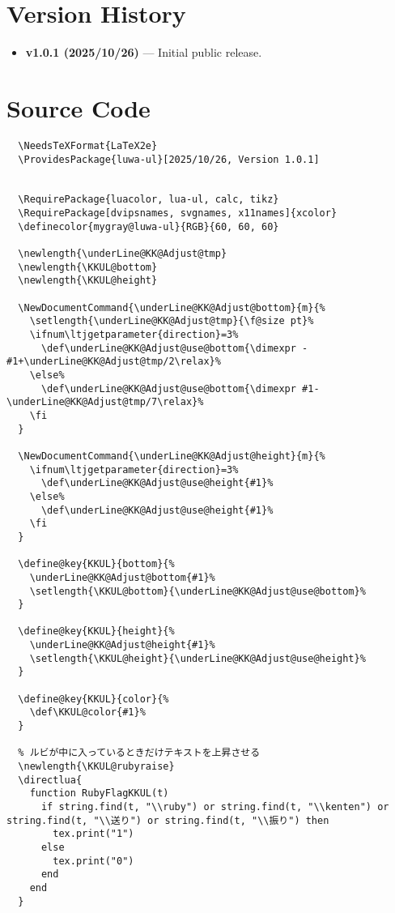 \documentclass[luatex,fontsize=8pt,paper=b5,twoside]{jlreq}%
\begin{document}
\section{Version History}
\begin{itemize}
  \item \textbf{v1.0.1 (2025/10/26)} --- Initial public release.
\end{itemize}

\section{Source Code}
\begin{lstlisting}
  \NeedsTeXFormat{LaTeX2e}
  \ProvidesPackage{luwa-ul}[2025/10/26, Version 1.0.1]


  \RequirePackage{luacolor, lua-ul, calc, tikz}
  \RequirePackage[dvipsnames, svgnames, x11names]{xcolor}
  \definecolor{mygray@luwa-ul}{RGB}{60, 60, 60}

  \newlength{\underLine@KK@Adjust@tmp}
  \newlength{\KKUL@bottom}
  \newlength{\KKUL@height}

  \NewDocumentCommand{\underLine@KK@Adjust@bottom}{m}{%
    \setlength{\underLine@KK@Adjust@tmp}{\f@size pt}%
    \ifnum\ltjgetparameter{direction}=3%
      \def\underLine@KK@Adjust@use@bottom{\dimexpr -#1+\underLine@KK@Adjust@tmp/2\relax}%
    \else%
      \def\underLine@KK@Adjust@use@bottom{\dimexpr #1-\underLine@KK@Adjust@tmp/7\relax}%
    \fi
  }

  \NewDocumentCommand{\underLine@KK@Adjust@height}{m}{%
    \ifnum\ltjgetparameter{direction}=3%
      \def\underLine@KK@Adjust@use@height{#1}%
    \else%
      \def\underLine@KK@Adjust@use@height{#1}%
    \fi
  }

  \define@key{KKUL}{bottom}{%
    \underLine@KK@Adjust@bottom{#1}%
    \setlength{\KKUL@bottom}{\underLine@KK@Adjust@use@bottom}%
  }

  \define@key{KKUL}{height}{%
    \underLine@KK@Adjust@height{#1}%
    \setlength{\KKUL@height}{\underLine@KK@Adjust@use@height}%
  }

  \define@key{KKUL}{color}{%
    \def\KKUL@color{#1}%
  }

  % ルビが中に入っているときだけテキストを上昇させる
  \newlength{\KKUL@rubyraise}
  \directlua{
    function RubyFlagKKUL(t)
      if string.find(t, "\\ruby") or string.find(t, "\\kenten") or string.find(t, "\\送り") or string.find(t, "\\振り") then
        tex.print("1")
      else
        tex.print("0")
      end
    end
  }


\end{lstlisting}
\end{document}

